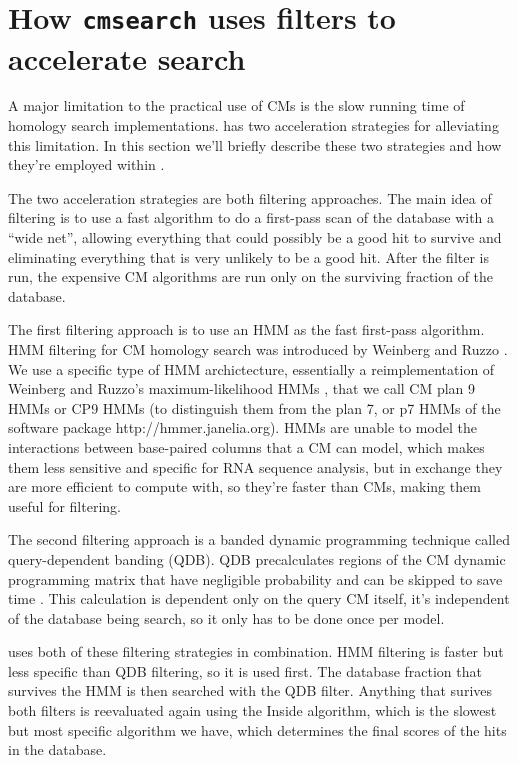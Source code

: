 \section{How \texttt{cmsearch} uses filters to accelerate search}

A major limitation to the practical use of CMs is the slow running
time of homology search implementations.  has two
acceleration strategies for alleviating this limitation. In this
section we'll briefly describe these two strategies and how they're
employed within .

The two acceleration strategies are both filtering approaches.  The
main idea of filtering is to use a fast algorithm to do a first-pass
scan of the database with a ``wide net'', allowing everything that
could possibly be a good hit to survive and eliminating everything
that is very unlikely to be a good hit. After the filter is run, the
expensive CM algorithms are run only on the surviving fraction of the
database.

The first filtering approach is to use an HMM as the fast first-pass
algorithm. HMM filtering for CM homology search was introduced by
Weinberg and Ruzzo
\cite{WeinbergRuzzo04,WeinbergRuzzo04b,WeinbergRuzzo06}. We use a
specific type of HMM archictecture, essentially a reimplementation of
Weinberg and Ruzzo's maximum-likelihood HMMs \cite{WeinbergRuzzo06},
that we call CM plan 9 HMMs or CP9 HMMs (to distinguish them from the
plan 7, or p7 HMMs of the  software package
http://hmmer.janelia.org). HMMs are unable to model the interactions
between base-paired columns that a CM can model, which makes them less
sensitive and specific for RNA sequence analysis, but in exchange they
are more efficient to compute with, so they're faster than CMs, making
them useful for filtering.

The second filtering approach is a banded dynamic programming
technique called query-dependent banding (QDB). QDB precalculates
regions of the CM dynamic programming matrix that have negligible
probability and can be skipped to save time
\cite{NawrockiEddy07}. This calculation is dependent only on the query
CM itself, it's independent of the database being search, so it only
has to be done once per model. 

 uses both of these filtering strategies in
combination. HMM filtering is faster but less specific than QDB
filtering, so it is used first. The database fraction that survives
the HMM is then searched with the QDB filter. Anything that surives
both filters is reevaluated again using the Inside algorithm, which is
the slowest but most specific algorithm we have, which determines the
final scores of the hits in the database. 

